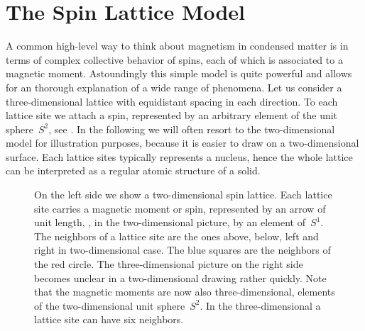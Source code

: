 \section{The Spin Lattice Model}\label{sec:model}
%
A common high-level way to think about magnetism in condensed matter is in terms
of complex collective behavior of spins, each of which is associated to a
magnetic moment. Astoundingly this simple model is quite powerful and allows for
an thorough explanation of a wide range of phenomena. Let us consider a
three-dimensional lattice with equidistant spacing in each direction. To each
lattice site we attach a spin, represented by an arbitrary element of the unit
sphere~$S^2$, see . In the following we will often resort to
the two-dimensional model for illustration purposes, because it is easier to
draw on a two-dimensional surface. Each lattice sites typically represents a
nucleus, hence the whole lattice can be interpreted as a regular atomic
structure of a solid.

\begin{figure}
  \centering
  \caption{On the left side we show a two-dimensional spin lattice. Each lattice
  site carries a magnetic moment or spin, represented by an arrow of unit
  length, \ie{}, in the two-dimensional picture, by an element of~$S^1$. The
  neighbors of a lattice site are the ones above, below, left and right in
  two-dimensional case. The blue squares are the neighbors of the red circle.
  The three-dimensional picture on the right side becomes unclear in a
  two-dimensional drawing rather quickly. Note that the magnetic moments are now
  also three-dimensional, \ie{} elements of the two-dimensional unit
  sphere~$S^2$. In the three-dimensional a lattice site can have six neighbors.}
\label{fig:lattice}
\end{figure}

